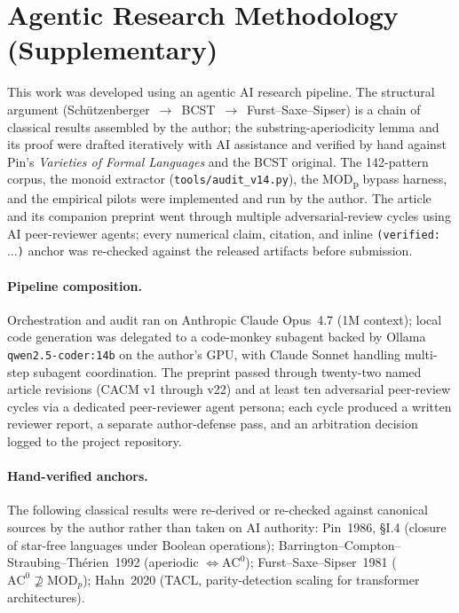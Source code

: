 \documentclass[letterpaper,twocolumn,10pt]{article}
\theoremstyle{definition}
\theoremstyle{remark}
\begin{document}



\appendix

\section{Agentic Research Methodology (Supplementary)}\label{app:methodology}

This work was developed using an agentic AI research pipeline.
The structural argument (Schützenberger~$\to$~BCST~$\to$~Furst--Saxe--Sipser)
is a chain of classical results assembled by the author; the
substring-aperiodicity lemma and its proof were drafted iteratively with AI
assistance and verified by hand against Pin's \emph{Varieties of Formal
Languages} and the BCST original.
The 142-pattern corpus, the monoid extractor (\texttt{tools/audit\_v14.py}),
the MOD\textsubscript{p} bypass harness, and the empirical pilots were
implemented and run by the author.
The article and its companion preprint went through multiple
adversarial-review cycles using AI peer-reviewer agents; every numerical
claim, citation, and inline \texttt{(verified: $\ldots$)} anchor was
re-checked against the released artifacts before submission.

\paragraph{Pipeline composition.}
Orchestration and audit ran on Anthropic Claude Opus~4.7 (1M context); local
code generation was delegated to a code-monkey subagent backed by Ollama
\texttt{qwen2.5-coder:14b} on the author's GPU, with Claude Sonnet
handling multi-step subagent coordination.
The preprint passed through twenty-two named article revisions (CACM v1
through v22) and at least ten adversarial peer-review cycles via a dedicated
peer-reviewer agent persona; each cycle produced a written reviewer report,
a separate author-defense pass, and an arbitration decision logged to the
project repository.

\paragraph{Hand-verified anchors.}
The following classical results were re-derived or re-checked against
canonical sources by the author rather than taken on AI authority:
Pin~1986, \S I.4 (closure of star-free languages under Boolean operations);
Barrington--Compton--Straubing--Th\'erien~1992 (aperiodic
$\Leftrightarrow\mathrm{AC}^0$); Furst--Saxe--Sipser~1981
($\mathrm{AC}^0 \not\supseteq \mathrm{MOD}_p$); Hahn~2020 (TACL,
parity-detection scaling for transformer architectures).
\end{document}
